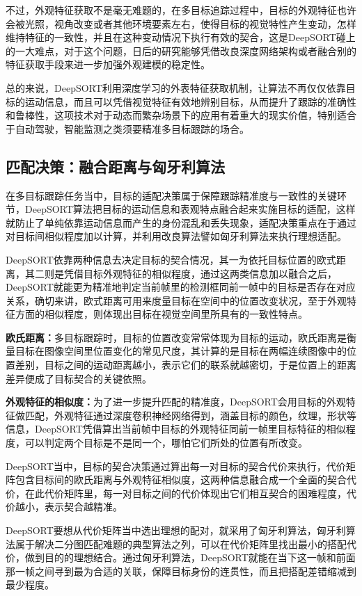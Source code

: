 不过，外观特征获取不是毫无难题的，在多目标追踪过程中，目标的外观特征也许会被光照，视角改变或者其他环境要素左右，使得目标的视觉特性产生变动，怎样维持特征的一致性，并且在这种变动情况下执行有效的契合，这是DeepSORT碰上的一大难点，对于这个问题，日后的研究能够凭借改良深度网络架构或者融合别的特征获取手段来进一步加强外观建模的稳定性。

总的来说，DeepSORT利用深度学习的外表特征获取机制，让算法不再仅仅依靠目标的运动信息，而且可以凭借视觉特征有效地辨别目标，从而提升了跟踪的准确性和鲁棒性，这项技术对于动态而繁杂场景下的应用有着重大的现实价值，特别适合于自动驾驶，智能监测之类须要精准多目标跟踪的场合。


\subsection{匹配决策：融合距离与匈牙利算法}

在多目标跟踪任务当中，目标的适配决策属于保障跟踪精准度与一致性的关键环节，DeepSORT算法把目标的运动信息和表观特点融合起来实施目标的适配，这样就防止了单纯依靠运动信息而产生的身份混乱和丢失现象，适配决策重点在于通过对目标间相似程度加以计算，并利用改良算法譬如匈牙利算法来执行理想适配。

DeepSORT依靠两种信息去决定目标的契合情况，其一为依托目标位置的欧式距离，其二则是凭借目标外观特征的相似程度，通过这两类信息加以融合之后，DeepSORT就能更为精准地判定当前帧里的检测框同前一帧中的目标是否存在对应关系，确切来讲，欧式距离可用来度量目标在空间中的位置改变状况，至于外观特征方面的相似程度，则体现出目标在视觉空间里所具有的一致性特点。

\textbf{欧氏距离：}多目标跟踪时，目标的位置改变常常体现为目标的运动，欧氏距离是衡量目标在图像空间里位置变化的常见尺度，其计算的是目标在两幅连续图像中的位置差别，目标之间的运动距离越小，表示它们的联系就越密切，于是位置上的距离差异便成了目标契合的关键依照。

\textbf{外观特征的相似度：}为了进一步提升匹配的精准度，DeepSORT会用目标的外观特征做匹配，外观特征通过深度卷积神经网络得到，涵盖目标的颜色，纹理，形状等信息，DeepSORT凭借算出当前帧中目标的外观特征同前一帧里目标特征的相似程度，可以判定两个目标是不是同一个，哪怕它们所处的位置有所改变。

DeepSORT当中，目标的契合决策通过算出每一对目标的契合代价来执行，代价矩阵包含目标间的欧氏距离与外观特征相似度，这两种信息融合成一个全面的契合代价，在此代价矩阵里，每一对目标之间的代价体现出它们相互契合的困难程度，代价越小，表示契合越精准。

DeepSORT要想从代价矩阵当中选出理想的配对，就采用了匈牙利算法，匈牙利算法属于解决二分图匹配难题的典型算法之列，可以在代价矩阵里找出最小的搭配代价，做到目的的理想结合。通过匈牙利算法，DeepSORT就能在当下这一帧和前面那一帧之间寻到最为合适的关联，保障目标身份的连贯性，而且把搭配差错缩减到最少程度。

